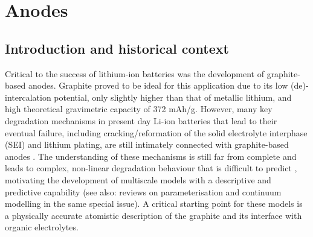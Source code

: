 \documentclass[../main.tex]{subfiles}
\begin{document}
\section{Anodes}
\label{sec:anodes}


\subsection{Introduction and historical context}
\label{sec:anodes_intro}

Critical to the success of lithium-ion batteries was the development of graphite-based anodes. Graphite proved to be ideal for this application due to its low (de)-intercalation potential, only slightly higher than that of metallic lithium, and high theoretical gravimetric capacity of 372 mAh/g. However, many key degradation mechanisms in present day Li-ion batteries that lead to their eventual failure, including cracking/reformation of the solid electrolyte interphase (SEI) and lithium plating, are still intimately connected with graphite-based anodes \cite{VETTER2005269,ma6041310}. The understanding of these mechanisms is still far from complete and leads to complex, non-linear degradation behaviour that is difficult to predict \cite{YANG201728}, motivating the development of multiscale models with a descriptive and predictive capability (see also: reviews on parameterisation and continuum modelling in the same special issue). A critical starting point for these models is a physically accurate atomistic description of the graphite and its interface with organic electrolytes. 
\end{document}
